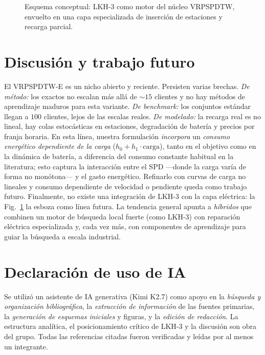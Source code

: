 \documentclass[conference]{IEEEtran}
\begin{document}
\begin{figure}[t]
  \centering
  \resizebox{\columnwidth}{!}{}
  \caption{Esquema conceptual: LKH-3 como motor del n\'ucleo VRPSPDTW, envuelto
  en una capa especializada de inserci\'on de estaciones y recarga parcial.}
  \label{fig:via1}
\end{figure}

\section{Discusi\'on y trabajo futuro}\label{sec:gaps}
El VRPSPDTW-E es un nicho abierto y reciente. Persisten varias brechas.
\emph{De m\'etodo:} los exactos no escalan m\'as all\'a de $\sim15$ clientes y
no hay m\'etodos de aprendizaje maduros para esta variante. \emph{De benchmark:}
los conjuntos est\'andar llegan a $100$ clientes, lejos de las escalas reales.
\emph{De modelado:} la recarga real es no lineal, hay colas estoc\'asticas en
estaciones, degradaci\'on de bater\'ia y precios por franja horaria. En esta
l\'inea, nuestra formulaci\'on \emph{incorpora} un \emph{consumo energ\'etico
dependiente de la carga} ($h_0+h_1\!\cdot\!\text{carga}$), tanto en el objetivo
como en la din\'amica de bater\'ia, a diferencia del consumo constante habitual
en la literatura; esto captura la interacci\'on entre el SPD ---donde la carga
var\'ia de forma no mon\'otona--- y el gasto energ\'etico. Refinarlo con curvas de
carga no lineales y consumo dependiente de velocidad o pendiente queda como
trabajo futuro. Finalmente, no existe una integraci\'on de LKH-3
con la capa el\'ectrica: la Fig.~\ref{fig:via1} la esboza como l\'inea futura. La
tendencia general apunta a \emph{h\'ibridos} que combinen un motor de b\'usqueda
local fuerte (como LKH-3) con reparaci\'on el\'ectrica especializada y, cada vez
m\'as, con componentes de aprendizaje para guiar la b\'usqueda a escala
industrial.

\section*{Declaraci\'on de uso de IA}
Se utiliz\'o un asistente de IA generativa (Kimi K2.7) como apoyo en la
\emph{b\'usqueda y organizaci\'on bibliogr\'afica}, la \emph{extracci\'on de
informaci\'on} de las fuentes primarias, la \emph{generaci\'on de esquemas
iniciales} y figuras, y la \emph{edici\'on de redacci\'on}. La estructura
anal\'itica, el posicionamiento cr\'itico de LKH-3 y la discusi\'on son obra del
grupo. Todas las referencias citadas fueron verificadas y le\'idas por al menos
un integrante.



\end{document}
